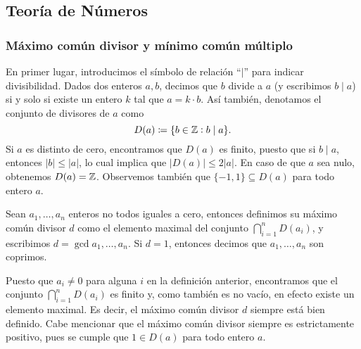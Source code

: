 \subsection{Teoría de Números}
\subsubsection{Máximo común divisor y mínimo común múltiplo}
\noindent
En primer lugar, introducimos el símbolo de relación ``$\mid$'' para indicar divisibilidad. Dados
dos enteros $a, b$, decimos que $b$ divide a $a$ (y escribimos $b \mid a$) si y solo si existe un
entero $k$ tal que $a = k \cdot b$. Así también, denotamos el conjunto de divisores de $a$ como
\begin{equation*}
	D(a) \coloneq \lbrace b \in \mathbb{Z} \vcentcolon b \mid a \rbrace.
\end{equation*}
Si $a$ es distinto de cero, encontramos que $D(a)$ es finito, puesto que si $b \mid a$, entonces
$|b| \leq |a|$, lo cual implica que $|D(a)| \leq 2|a|$. En caso de que $a$ sea nulo, obtenemos $D(a)
= \mathbb{Z}$. Observemos también que $\lbrace -1, 1 \rbrace \subseteq D(a)$ para todo entero $a$.

\begin{definition}
	\label{prerreq:def:gcd}
	Sean $a_1, \ldots, a_n$ enteros no todos iguales a cero, entonces definimos su máximo común
	divisor $d$ como el elemento maximal del conjunto $\bigcap_{i=1}^{n}D(a_i)$, y escribimos $d =
	\gcd{a_1, \ldots, a_n}$. Si $d = 1$, entonces decimos que $a_1, \ldots, a_n$ son coprimos.
\end{definition}

Puesto que $a_i \neq 0$ para alguna $i$ en la definición anterior, encontramos que el conjunto
$\bigcap_{i=1}^{n}D(a_i)$ es finito y, como también es no vacío, en efecto existe un elemento maximal.
Es decir, el máximo común divisor $d$ siempre está bien definido. Cabe mencionar que el máximo común
divisor siempre es estrictamente positivo, pues se cumple que $1 \in D(a)$ para todo entero $a$.

